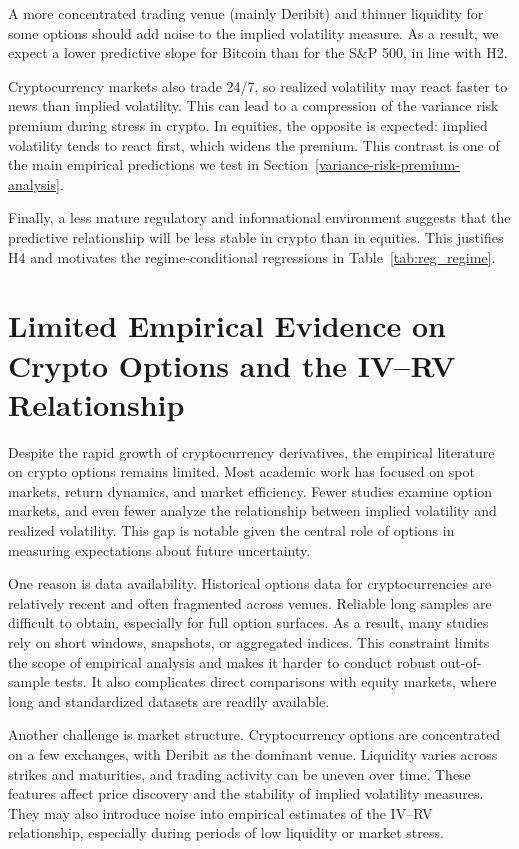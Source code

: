 \documentclass[11pt,a4paper,openany]{report}
\begin{document}
A more concentrated trading venue (mainly Deribit) and thinner
liquidity for some options should add noise to the implied volatility
measure. As a result, we expect a lower predictive slope for Bitcoin
than for the S\&P 500, in line with H2.

Cryptocurrency markets also trade 24/7, so realized volatility may
react faster to news than implied volatility. This can lead to a
compression of the variance risk premium during stress in crypto. In
equities, the opposite is expected: implied volatility tends to react
first, which widens the premium. This contrast is one of the main
empirical predictions we test in
Section~\ref{variance-risk-premium-analysis}.

Finally, a less mature regulatory and informational environment
suggests that the predictive relationship will be less stable in
crypto than in equities. This justifies H4 and motivates the
regime-conditional regressions in Table~\ref{tab:reg_regime}.

\section{Limited Empirical Evidence on Crypto Options and the IV--RV
Relationship}\label{limited-empirical-evidence-on-crypto-options-and-the-ivrv-relationship}

Despite the rapid growth of cryptocurrency derivatives, the empirical
literature on crypto options remains limited. Most academic work has
focused on spot markets, return dynamics, and market efficiency. Fewer
studies examine option markets, and even fewer analyze the relationship
between implied volatility and realized volatility. This gap is notable
given the central role of options in measuring expectations about future
uncertainty.

One reason is data availability. Historical options data for
cryptocurrencies are relatively recent and often fragmented across
venues. Reliable long samples are difficult to obtain, especially for
full option surfaces. As a result, many studies rely on short windows,
snapshots, or aggregated indices. This constraint limits the scope of
empirical analysis and makes it harder to conduct robust out-of-sample
tests. It also complicates direct comparisons with equity markets, where
long and standardized datasets are readily available.

Another challenge is market structure. Cryptocurrency options are
concentrated on a few exchanges, with Deribit as the dominant venue.
Liquidity varies across strikes and maturities, and trading activity can
be uneven over time. These features affect price discovery and the
stability of implied volatility measures. They may also introduce noise
into empirical estimates of the IV--RV relationship, especially during
periods of low liquidity or market stress.
\end{document}
